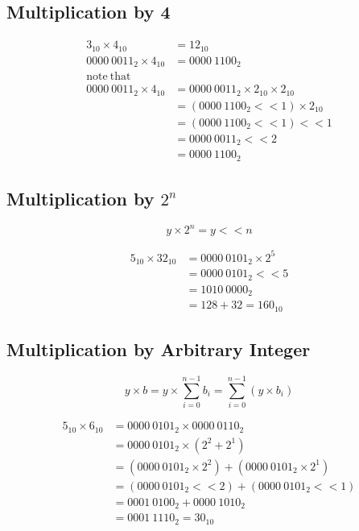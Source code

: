 \documentclass{article}
\begin{document}
\subsection{Multiplication by 4}

\begin{align*}
3_{10} \times 4_{10} &= 12_{10} \\
0000\ 0011_2 \times 4_{10} &= 0000\ 1100_2 \\
\mathrm{note\ that} & \\
0000\ 0011_2 \times 4_{10} &= 0000\ 0011_2 \times 2_{10} \times 2_{10} \\
                           &= (0000\ 1100_2 << 1) \times 2_{10} \\
                           &= (0000\ 1100_2 << 1) << 1 \\
                           &= 0000\ 0011_2 << 2 \\
                           &= 0000\ 1100_2
\end{align*}

\subsection{Multiplication by $2^n$}

\[ y \times 2^n = y << n \]

\begin{align*}
5_{10} \times 32_{10} &= 0000\ 0101_2 \times 2^5 \\
                      &= 0000\ 0101_2 << 5 \\
                      &= 1010\ 0000_2 \\
                      &= 128 + 32 = 160_{10}
\end{align*}

\subsection{Multiplication by Arbitrary Integer}

\[ y \times b = y \times \sum_{i=0}^{n-1}b_i = \sum_{i=0}^{n-1}\left( y \times b_i \right) \]

\begin{align*}
5_{10} \times 6_{10} &= 0000\ 0101_2 \times 0000\ 0110_2 \\
                     &= 0000\ 0101_2 \times \left( 2^2 + 2^1 \right) \\
                     &= \left( 0000\ 0101_2 \times 2^2 \right) + \left( 0000\ 0101_2 \times 2^1 \right) \\
                     &= (0000\ 0101_2 << 2) + (0000\ 0101_2 << 1) \\
                     &= 0001\ 0100_2 + 0000\ 1010_2 \\
                     &= 0001\ 1110_2 = 30_{10}
\end{align*}
\end{document}
